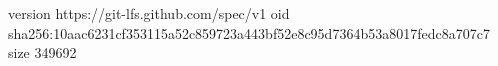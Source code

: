 version https://git-lfs.github.com/spec/v1
oid sha256:10aac6231cf353115a52c859723a443bf52e8c95d7364b53a8017fedc8a707c7
size 349692
